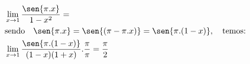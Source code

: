 \begin{ex}
\begin{align}
&\lim_{x\rightarrow 1} \frac{\sen{\pi.x}}{1-x^2}=\nonumber\\
&\text{sendo}\quad\sen{\pi.x}=\sen{(\pi-\pi.x)}=\sen{\pi.(1-x)},\quad\text{temos:}\nonumber\\
&\lim_{x\rightarrow 1} \frac{\sen{\pi.(1-x)}}{(1-x)(1+x)}.\frac{\pi}{\pi}=\frac{\pi}{2}\nonumber
\end{align}
\end{ex}